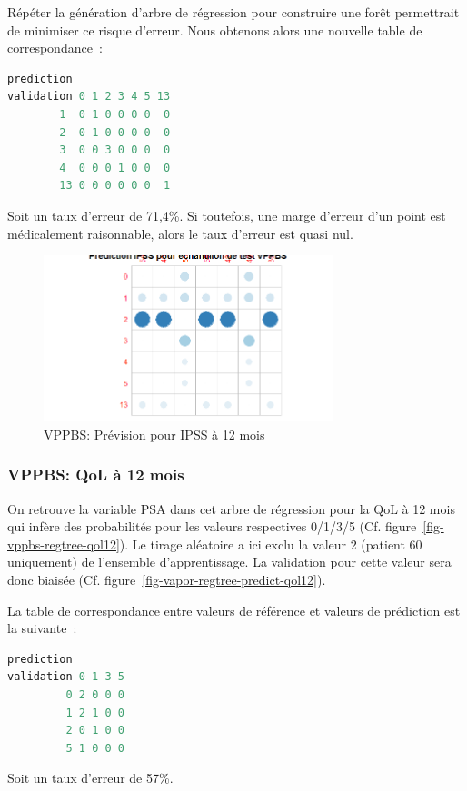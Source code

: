 Répéter la génération d'arbre de régression pour construire une forêt permettrait de
minimiser ce risque d'erreur. Nous obtenons alors une nouvelle table de correspondance~:

\begin{lstlisting}[language=R]
          prediction
validation 0 1 2 3 4 5 13
        1  0 1 0 0 0 0  0
        2  0 1 0 0 0 0  0
        3  0 0 3 0 0 0  0
        4  0 0 0 1 0 0  0
        13 0 0 0 0 0 0  1
\end{lstlisting}
Soit un taux d'erreur de 71,4\%. Si toutefois, une marge d'erreur d'un point est médicalement raisonnable, alors le taux d'erreur est quasi nul.

\begin{figure}[H]
\centering
\includegraphics[width=0.75\textwidth]{../Fig/VPPBS/vppbs-regtree-predict-ipss12.png}
\caption{VPPBS: Prévision pour IPSS à 12 mois}
\label{fig-vppbs-regtree-predict-ipss12}
\end{figure}

\subsubsection{VPPBS: QoL à 12 mois}

On retrouve la variable PSA dans cet arbre de régression pour la QoL à 12 mois
qui infère des probabilités pour les valeurs respectives 0/1/3/5 (Cf. figure~\ref{fig-vppbs-regtree-qol12}). Le tirage aléatoire a ici exclu la valeur 2
(patient 60 uniquement) de l'ensemble d'apprentissage. La validation pour cette
valeur sera donc biaisée (Cf. figure~\ref{fig-vapor-regtree-predict-qol12}).

La table de correspondance entre valeurs de référence et valeurs de prédiction est la suivante~:
\begin{lstlisting}[language=R]
          prediction
validation 0 1 3 5
         0 2 0 0 0
         1 2 1 0 0
         2 0 1 0 0
         5 1 0 0 0
\end{lstlisting}
Soit un taux d'erreur de 57\%.


